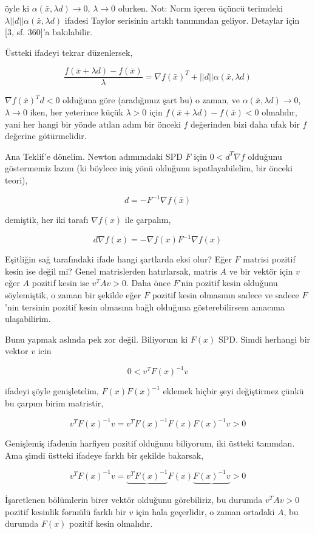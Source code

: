 \documentclass[12pt,fleqn]{article}\usepackage{../../common}
\begin{document}
öyle ki $\alpha(\bar{x},\lambda d) \to 0$, $\lambda \to 0$ olurken. Not:
Norm içeren üçüncü terimdeki $\lambda ||d|| \alpha(\bar{x},\lambda d)$
ifadesi Taylor serisinin artıklı tanımından geliyor. Detaylar için [3,
sf. 360]'a bakılabilir.

Üstteki ifadeyi tekrar düzenlersek,

$$
\frac{f(\bar{x} + \lambda d) - f(\bar{x})}{\lambda} = 
\nabla f(\bar{x})^T + ||d||\alpha(\bar{x},\lambda d)
$$

$\nabla f(\bar{x})^T d < 0$ olduğuna göre (aradığımız şart bu) o zaman, ve
$\alpha(\bar{x},\lambda d) \to 0$, $\lambda \to 0$ iken, her yeterince
küçük $\lambda > 0$ için $f(\bar{x} + \lambda d)-f(\bar{x}) < 0$ olmalıdır,
yani her hangi bir yönde atılan adım bir önceki $f$ değerinden bizi daha
ufak bir $f$ değerine götürmelidir. 

Ana Teklif'e dönelim. Newton adımınıdaki SPD $F$ için $0 < d^T \nabla f$
olduğunu göstermemiz lazım (ki böylece iniş yönü olduğunu ispatlayabilelim,
bir önceki teori),

$$
d = -F^{-1} \nabla f(\bar{x})
$$

demiştik, her iki tarafı $\nabla f(x)$ ile çarpalım,

$$
d \nabla f(x) = -\nabla f(x) F^{-1} \nabla f(x) 
$$

Eşitliğin sağ tarafındaki ifade hangi şartlarda eksi olur? Eğer $F$ matrisi
pozitif kesin ise değil mi? Genel matrislerden hatırlarsak, matris $A$ ve
bir vektör için $v$ eğer $A$ pozitif kesin ise $v^TAv > 0$. Daha önce
$F$'nin pozitif kesin olduğunu söylemiştik, o zaman bir şekilde eğer $F$
pozitif kesin olmasının sadece ve sadece $F$'nin tersinin pozitif kesin
olmasına bağlı olduğuna gösterebilirsem amacıma ulaşabilirim.

Bunu yapmak aslında pek zor değil. Biliyorum ki $F(x)$ SPD. Simdi herhangi
bir vektor $v$ icin 

$$
0 < v^T F(x)^{-1}v
$$

ifadeyi şöyle genişletelim, $F(x)F(x)^{-1}$ eklemek hiçbir şeyi değiştirmez
çünkü bu çarpım birim matristir, 

$$
v^T F(x)^{-1}v = v^T F(x)^{-1} F(x)F(x)^{-1} v > 0
$$

Genişlemiş ifadenin harfiyen pozitif olduğunu biliyorum, iki üstteki
tanımdan. Ama şimdi üstteki ifadeye farklı bir şekilde bakarsak,

$$
v^T F(x)^{-1}v = \underbrace{v^TF(x)^{-1}} F(x) \underbrace{F(x)^{-1} v} > 0
$$

İşaretlenen bölümlerin birer vektör olduğunu görebiliriz, bu durumda
$v^TAv > 0$ pozitif kesinlik formülü farklı bir $v$ için hala geçerlidir, o
zaman ortadaki $A$, bu durumda $F(x)$ pozitif kesin olmalıdır. 
\end{document}
